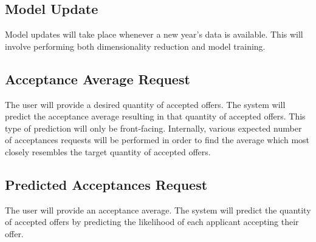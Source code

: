 \documentclass[titlepage]{article}
\begin{document}
\subsection{Model Update}
Model updates will take place whenever a new year's data is available. This will involve performing both dimensionality reduction and model training.
\subsection{Acceptance Average Request}
The user will provide a desired quantity of accepted offers. The system will predict the acceptance average resulting in that quantity of accepted offers. This type of prediction will only be front-facing. Internally, various expected number of acceptances requests will be performed in order to find the average which most closely resembles the target quantity of accepted offers.
\subsection{Predicted Acceptances Request}
The user will provide an acceptance average. The system will predict the quantity of accepted offers by predicting the likelihood of each applicant accepting their offer.
\end{document}
